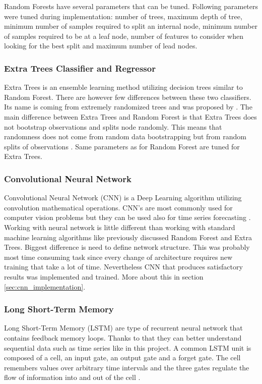 \documentclass{article}
\begin{document}
Random Forests have several parameters that can be tuned. Following parameters were tuned during implementation: number of trees, maximum depth of tree, minimum number of samples required to split an internal node, minimum number of samples required to be at a leaf node, number of features to consider when looking for the best split and maximum number of lead nodes. 

\subsubsection{Extra Trees Classifier and Regressor}
Extra Trees is an ensemble learning method utilizing decision trees similar to Random Forest. There are however few differences between these two classifiers. Its name is coming from extremely randomized trees and was proposed by \citep{geurts206extratree}. The main difference between Extra Trees and Random Forest is that Extra Trees does not bootstrap observations and splits node randomly. This means that randomness does not come from random data bootstrapping but from random splits of observations \citep{bhandari2019extratree}. Same parameters as for Random Forest are tuned for Extra Trees.

\subsubsection{Convolutional Neural Network}
Convolutional Neural Network (CNN) is a Deep Learning algorithm utilizing convolution mathematical operations. CNN's are most commonly used for computer vision problems but they can be used also for time series forecasting \citep{brownlee2019cnn} \citep{granat2020cnn}. Working with neural network is little different than working with standard machine learning algorithms like previously discussed Random Forest and Extra Trees. Biggest difference is need to define network structure. This was probably most time consuming task since every change of architecture requires new training that take a lot of time. Nevertheless CNN that produces satisfactory results was implemented and trained. More about this in section \ref{sec:cnn_implementation}. 

\subsubsection{Long Short-Term Memory}
Long Short-Term Memory (LSTM) are type of recurrent neural network that contains feedback memory loops. Thanks to that they can better understand sequential data such as time series like in this project. A common LSTM unit is composed of a cell, an input gate, an output gate and a forget gate. The cell remembers values over arbitrary time intervals and the three gates regulate the flow of information into and out of the cell \citep{wiki2020lstm}. 
\end{document}
